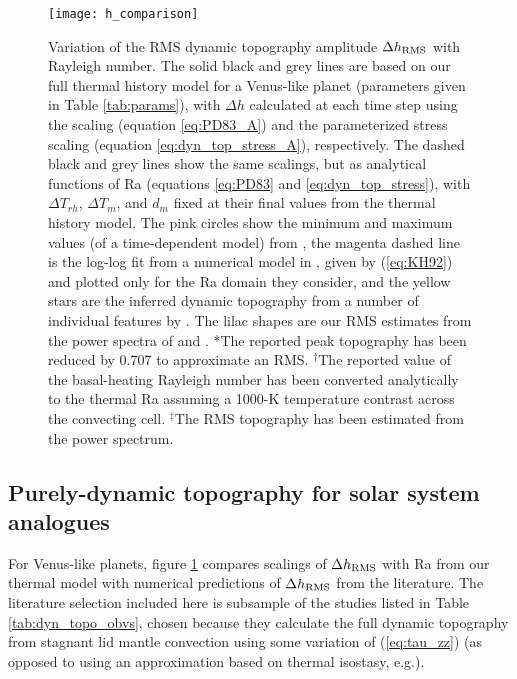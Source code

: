 \begin{figure}
  \centering
  \texttt{[image: h\_comparison]}
\caption{Variation of the RMS dynamic topography amplitude $\Delta h_{\rm RMS}$ with Rayleigh number. The solid black and grey lines are based on our full thermal history model for a Venus-like planet (parameters given in Table \ref{tab:params}), with $\Delta h$ calculated at each time step using the \citet{Parsons1983} scaling (equation \ref{eq:PD83_A}) and the parameterized stress scaling (equation \ref{eq:dyn_top_stress_A}), respectively. The dashed black and grey lines show the same scalings, but as analytical functions of Ra (equations \ref{eq:PD83} and \ref{eq:dyn_top_stress}), with $\Delta T_{rh}$, $\Delta T_m$, and $d_m$ fixed at their final values from the thermal history model. The pink circles show the minimum and maximum values (of a time-dependent model) from \citet{Kiefer1998}, the magenta dashed line is the log-log fit from a numerical model in \citet{Kiefer1992}, given by (\ref{eq:KH92}) and plotted only for the Ra domain they consider, and the yellow stars are the inferred dynamic topography from a number of individual features by \citet{Nimmo1996}. The lilac shapes are our RMS estimates from the power spectra of \citet{Huang2013} and \citet{Yang2016}. \;\; *The reported peak topography has been reduced by 0.707 to approximate an RMS. \;\; $^\dagger$The reported value of the basal-heating Rayleigh number has been converted analytically to the thermal Ra assuming a 1000-K temperature contrast across the convecting cell. \;\; $^\ddagger$The RMS topography has been estimated from the power spectrum.}
\label{fig:RMS_benchmark}
\end{figure}


\subsection{Purely-dynamic topography for solar system analogues}\label{sec:results-comparison}


For Venus-like planets, figure \ref{fig:RMS_benchmark} compares scalings of $\Delta h_{\rm RMS}$ with Ra from our thermal model with numerical predictions of $\Delta h_{\rm RMS}$ from the literature. The literature selection included here is subsample of the studies listed in Table \ref{tab:dyn_topo_obvs}, chosen because they calculate the full dynamic topography from stagnant lid mantle convection using some variation of (\ref{eq:tau_zz}) (as opposed to using an approximation based on thermal isostasy, e.g.).


